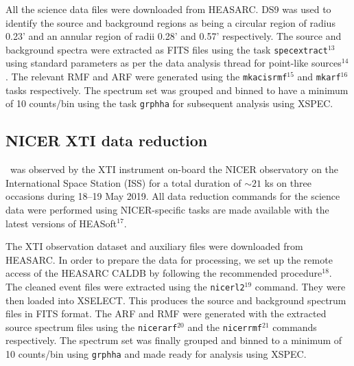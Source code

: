     	All the science data files were downloaded from HEASARC. DS9 was used to identify the source and background regions as being a circular region of radius 0.23' and an annular region of radii 0.28' and 0.57' respectively. The source and background spectra were extracted as FITS files using the task \texttt{specextract}$^{13}$ using standard parameters as per the data analysis thread for point-like sources$^{14}$. The relevant RMF and ARF were generated using the \texttt{mkacisrmf}$^{15}$ and \texttt{mkarf}$^{16}$ tasks respectively. The spectrum set was grouped and binned to have a minimum of 10 counts/bin using the task \texttt{grphha} for subsequent analysis using XSPEC.
    
    \subsection{NICER XTI data reduction}
    	\source\ was observed by the XTI instrument on-board the NICER observatory on the International Space Station (ISS) for a total duration of $\sim 21$ ks on three occasions during 18--19 May 2019. All data reduction commands for the science data were performed using NICER-specific tasks are made available with the latest versions of HEASoft$^{17}$.
    	
    	The XTI observation dataset and auxiliary files were downloaded from HEASARC. In order to prepare the data for processing, we set up the remote access of the HEASARC CALDB by following the recommended procedure$^{18}$. The cleaned event files were extracted using the \texttt{nicerl2}$^{19}$ command. They were then loaded into XSELECT. This produces the source and background spectrum files in FITS format. The ARF and RMF were generated with the extracted source spectrum files using the \texttt{nicerarf}$^{20}$ and the \texttt{nicerrmf}$^{21}$ commands respectively. The spectrum set was finally grouped and binned to a minimum of 10 counts/bin using \texttt{grphha} and made ready for analysis using XSPEC.
